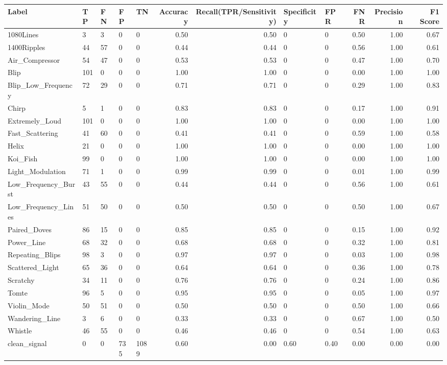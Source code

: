 \begin{tabular}{lllllrrllrrr}
\toprule
Label & TP & FN & FP & TN & Accuracy & Recall(TPR/Sensitivity) & Specificity & FPR & FNR & Precision & F1 Score \\
\midrule
1080Lines & 3 & 3 & 0 & 0 & 0.50 & 0.50 & 0 & 0 & 0.50 & 1.00 & 0.67 \\
1400Ripples & 44 & 57 & 0 & 0 & 0.44 & 0.44 & 0 & 0 & 0.56 & 1.00 & 0.61 \\
Air_Compressor & 54 & 47 & 0 & 0 & 0.53 & 0.53 & 0 & 0 & 0.47 & 1.00 & 0.70 \\
Blip & 101 & 0 & 0 & 0 & 1.00 & 1.00 & 0 & 0 & 0.00 & 1.00 & 1.00 \\
Blip_Low_Frequency & 72 & 29 & 0 & 0 & 0.71 & 0.71 & 0 & 0 & 0.29 & 1.00 & 0.83 \\
Chirp & 5 & 1 & 0 & 0 & 0.83 & 0.83 & 0 & 0 & 0.17 & 1.00 & 0.91 \\
Extremely_Loud & 101 & 0 & 0 & 0 & 1.00 & 1.00 & 0 & 0 & 0.00 & 1.00 & 1.00 \\
Fast_Scattering & 41 & 60 & 0 & 0 & 0.41 & 0.41 & 0 & 0 & 0.59 & 1.00 & 0.58 \\
Helix & 21 & 0 & 0 & 0 & 1.00 & 1.00 & 0 & 0 & 0.00 & 1.00 & 1.00 \\
Koi_Fish & 99 & 0 & 0 & 0 & 1.00 & 1.00 & 0 & 0 & 0.00 & 1.00 & 1.00 \\
Light_Modulation & 71 & 1 & 0 & 0 & 0.99 & 0.99 & 0 & 0 & 0.01 & 1.00 & 0.99 \\
Low_Frequency_Burst & 43 & 55 & 0 & 0 & 0.44 & 0.44 & 0 & 0 & 0.56 & 1.00 & 0.61 \\
Low_Frequency_Lines & 51 & 50 & 0 & 0 & 0.50 & 0.50 & 0 & 0 & 0.50 & 1.00 & 0.67 \\
Paired_Doves & 86 & 15 & 0 & 0 & 0.85 & 0.85 & 0 & 0 & 0.15 & 1.00 & 0.92 \\
Power_Line & 68 & 32 & 0 & 0 & 0.68 & 0.68 & 0 & 0 & 0.32 & 1.00 & 0.81 \\
Repeating_Blips & 98 & 3 & 0 & 0 & 0.97 & 0.97 & 0 & 0 & 0.03 & 1.00 & 0.98 \\
Scattered_Light & 65 & 36 & 0 & 0 & 0.64 & 0.64 & 0 & 0 & 0.36 & 1.00 & 0.78 \\
Scratchy & 34 & 11 & 0 & 0 & 0.76 & 0.76 & 0 & 0 & 0.24 & 1.00 & 0.86 \\
Tomte & 96 & 5 & 0 & 0 & 0.95 & 0.95 & 0 & 0 & 0.05 & 1.00 & 0.97 \\
Violin_Mode & 50 & 51 & 0 & 0 & 0.50 & 0.50 & 0 & 0 & 0.50 & 1.00 & 0.66 \\
Wandering_Line & 3 & 6 & 0 & 0 & 0.33 & 0.33 & 0 & 0 & 0.67 & 1.00 & 0.50 \\
Whistle & 46 & 55 & 0 & 0 & 0.46 & 0.46 & 0 & 0 & 0.54 & 1.00 & 0.63 \\
clean_signal & 0 & 0 & 735 & 1089 & 0.60 & 0.00 & 0.60 & 0.40 & 0.00 & 0.00 & 0.00 \\
\bottomrule
\end{tabular}
